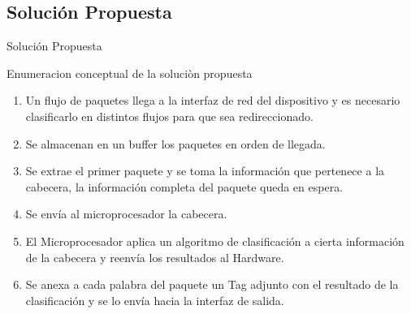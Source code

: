 \documentclass[xcolor=dvipsnames]{beamer}
\begin{document}
\subsection{Solución Propuesta}
\begin{frame}{Solución Propuesta}
\begin{block}{Enumeracion conceptual de la soluciòn propuesta}  
    \begin{enumerate}
      \scriptsize

      	\item Un flujo de paquetes llega a la interfaz de red del dispositivo y es necesario clasificarlo en distintos flujos para que sea redireccionado.
 	\item Se almacenan en un buffer los paquetes en orden de llegada.
	\item Se extrae el primer paquete y se toma la información que pertenece a la cabecera, la información completa del paquete queda en espera.
	\item Se envía al microprocesador la cabecera. 
	\item El Microprocesador aplica un algoritmo de clasificación a cierta información de la cabecera y reenvía los resultados al Hardware. 
	\item Se anexa a cada palabra del paquete un Tag adjunto con el resultado de la clasificación y se lo envía hacia la interfaz de salida.

    \end{enumerate}
  \end{block}
\end{frame}
\end{document}
